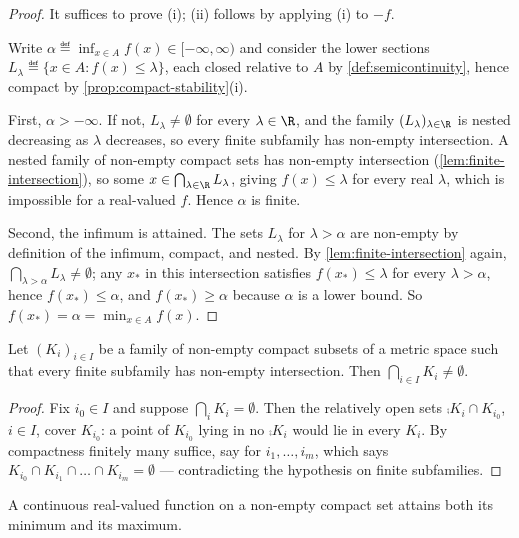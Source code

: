 \begin{proof}
	It suffices to prove (i); (ii) follows by applying (i) to $-f$.

	Write $\alpha\eqdef\inf_{x\in A}f(x)\in[-\infty,\infty)$ and consider the lower
	sections $L_\lambda\eqdef\{x\in A : f(x)\leq\lambda\}$, each closed relative to
	$A$ by \autoref{def:semicontinuity}, hence compact by
	\autoref{prop:compact-stability}(i).

	First, $\alpha>-\infty$. If not, $L_\lambda\neq\emptyset$ for every
	$\lambda\in\R$, and the family $(L_\lambda)_{\lambda\in\R}$ is nested
	decreasing as $\lambda$ decreases, so every finite subfamily has non-empty
	intersection. A nested family of non-empty compact sets has non-empty
	intersection (\autoref{lem:finite-intersection}), so some
	$x\in\bigcap_{\lambda\in\R}L_\lambda$, giving $f(x)\leq\lambda$ for every real
	$\lambda$, which is impossible for a real-valued $f$. Hence $\alpha$ is finite.

	Second, the infimum is attained. The sets $L_\lambda$ for $\lambda>\alpha$ are
	non-empty by definition of the infimum, compact, and nested. By
	\autoref{lem:finite-intersection} again,
	$\bigcap_{\lambda>\alpha}L_\lambda\neq\emptyset$; any $x_\ast$ in this
	intersection satisfies $f(x_\ast)\leq\lambda$ for every $\lambda>\alpha$, hence
	$f(x_\ast)\leq\alpha$, and $f(x_\ast)\geq\alpha$ because $\alpha$ is a lower
	bound. So $f(x_\ast)=\alpha=\min_{x\in A}f(x)$.
\end{proof}

\begin{lemma}\label{lem:finite-intersection}
	Let $(K_i)_{i\in I}$ be a family of non-empty compact subsets of a metric space
	such that every finite subfamily has non-empty intersection. Then
	$\bigcap_{i\in I}K_i\neq\emptyset$.
\end{lemma}

\begin{proof}
	Fix $i_0\in I$ and suppose $\bigcap_{i}K_i=\emptyset$. Then the relatively open
	sets $\comp{K_i}\cap K_{i_0}$, $i\in I$, cover $K_{i_0}$: a point of $K_{i_0}$
	lying in no $\comp{K_i}$ would lie in every $K_i$. By compactness finitely many
	suffice, say for $i_1,\dots,i_m$, which says
	$K_{i_0}\cap K_{i_1}\cap\dots\cap K_{i_m}=\emptyset$ --- contradicting the
	hypothesis on finite subfamilies.
\end{proof}

\begin{corollary}\label{cor:weierstrass-continuous}
	A continuous real-valued function on a non-empty compact set attains both its
	minimum and its maximum.
\end{corollary}

